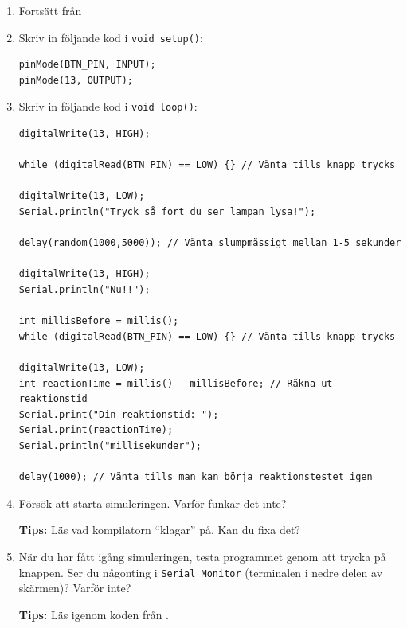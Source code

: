 \documentclass[11pt]{article}
\begin{document}
\begin{enumerate}[itemsep=1em]
      \item
            Fortsätt från 
      \item Skriv in följande kod i \texttt{void setup()}:
            \begin{lstlisting}
pinMode(BTN_PIN, INPUT);
pinMode(13, OUTPUT);
            \end{lstlisting}
      \item Skriv in följande kod i \texttt{void loop()}:
            \begin{lstlisting}
digitalWrite(13, HIGH);

while (digitalRead(BTN_PIN) == LOW) {} // Vänta tills knapp trycks

digitalWrite(13, LOW);
Serial.println("Tryck så fort du ser lampan lysa!");

delay(random(1000,5000)); // Vänta slumpmässigt mellan 1-5 sekunder

digitalWrite(13, HIGH);
Serial.println("Nu!!");

int millisBefore = millis();
while (digitalRead(BTN_PIN) == LOW) {} // Vänta tills knapp trycks

digitalWrite(13, LOW);
int reactionTime = millis() - millisBefore; // Räkna ut reaktionstid
Serial.print("Din reaktionstid: ");
Serial.print(reactionTime);
Serial.println("millisekunder");

delay(1000); // Vänta tills man kan börja reaktionstestet igen
                  \end{lstlisting}
      \item Försök att starta simuleringen. Varför funkar det inte?

            \textbf{Tips: } Läs vad kompilatorn ``klagar'' på. Kan du fixa det?
      \item När du har fått igång simuleringen, testa programmet genom att
            trycka på knappen. Ser du någonting i \texttt{Serial Monitor}
            (terminalen i
            nedre delen av skärmen)? Varför inte?

            \textbf{Tips: } Läs igenom koden från
            .
\end{enumerate}
\end{document}
